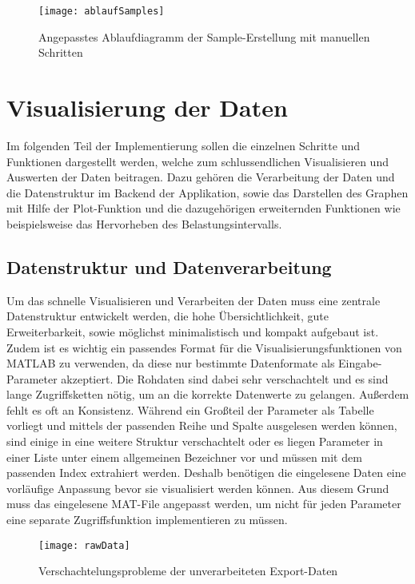 \begin{figure}[H]
	\centering
	\texttt{[image: ablaufSamples]}
	\caption{Angepasstes Ablaufdiagramm der Sample-Erstellung mit manuellen Schritten}
	\label{fig:ablaufSamples}
\end{figure}

\section{Visualisierung der Daten}

Im folgenden Teil der Implementierung sollen die einzelnen Schritte und Funktionen dargestellt werden, welche zum schlussendlichen Visualisieren und Auswerten der Daten beitragen. Dazu gehören die Verarbeitung der Daten und die Datenstruktur im Backend der Applikation, sowie das Darstellen des Graphen mit Hilfe der Plot-Funktion und die dazugehörigen erweiternden Funktionen wie beispielsweise das Hervorheben des Belastungsintervalls.

\subsection{Datenstruktur und Datenverarbeitung}

Um das schnelle Visualisieren und Verarbeiten der Daten muss eine zentrale Datenstruktur entwickelt werden, die hohe Übersichtlichkeit, gute Erweiterbarkeit, sowie möglichst minimalistisch und kompakt aufgebaut ist. Zudem ist es wichtig ein passendes Format für die Visualisierungsfunktionen von MATLAB zu verwenden, da diese nur bestimmte Datenformate als Eingabe-Parameter akzeptiert. Die Rohdaten sind dabei sehr verschachtelt und es sind lange Zugriffsketten nötig, um an die korrekte Datenwerte zu gelangen. Außerdem fehlt es oft an Konsistenz. Während ein Großteil der Parameter als Tabelle vorliegt und mittels der passenden Reihe und Spalte ausgelesen werden können, sind einige in eine weitere Struktur verschachtelt oder es liegen Parameter in einer Liste unter einem allgemeinen Bezeichner vor und müssen mit dem passenden Index extrahiert werden. Deshalb benötigen die eingelesene Daten eine vorläufige Anpassung bevor sie visualisiert werden können. Aus diesem Grund muss das eingelesene MAT-File angepasst werden, um nicht für jeden Parameter eine separate Zugriffsfunktion implementieren zu müssen.

\begin{figure}[H]
	\centering
	\texttt{[image: rawData]}
	\caption{Verschachtelungsprobleme der unverarbeiteten Export-Daten}
	\label{fig:rawData}
\end{figure}

